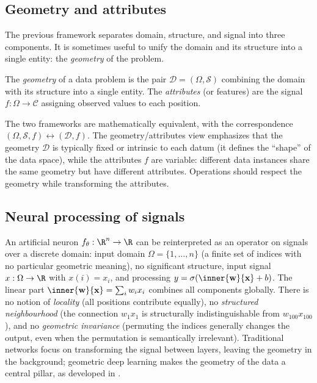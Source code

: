 \subsection{Geometry and attributes}
\label{sec:found:geometry-attributes}

The previous framework separates domain, structure, and signal into three
components. It is sometimes useful to unify the domain and its structure into a
single entity: the \emph{geometry} of the problem.

\begin{definition}
\label{def:found:geometry}
The \emph{geometry} of a data problem is the pair $\mathcal{D} = (\Omega,
\mathcal{S})$ combining the domain with its structure into a single entity. The
\emph{attributes} (or features) are the signal $f : \Omega \to \mathcal{C}$
assigning observed values to each position.
\end{definition}

The two frameworks are mathematically equivalent, with the correspondence
$(\Omega, \mathcal{S}, f) \leftrightarrow (\mathcal{D}, f)$. The
geometry/attributes view emphasizes that the geometry $\mathcal{D}$ is typically
fixed or intrinsic to each datum (it defines the ``shape'' of the data space),
while the attributes $f$ are variable: different data instances share the same
geometry but have different attributes. Operations should respect the geometry
while transforming the attributes.

\subsection{Neural processing of signals}
\label{sec:found:neuron-as-operator}

An artificial neuron $f_\theta : \R^n \to \R$ can be reinterpreted as an operator
on signals over a discrete domain: input domain $\Omega = \{1, \ldots, n\}$ (a
finite set of indices with no particular geometric meaning), no significant
structure, input signal $x : \Omega \to \R$ with $x(i) = x_i$, and processing
$y = \sigma(\inner{\mathbf{w}}{\mathbf{x}} + b)$. The linear part
$\inner{\mathbf{w}}{\mathbf{x}} = \sum_i w_i x_i$ combines all components
globally. There is no notion of \emph{locality} (all positions contribute
equally), no \emph{structured neighbourhood} (the connection $w_1 x_1$ is
structurally indistinguishable from $w_{100} x_{100}$), and no \emph{geometric
invariance} (permuting the indices generally changes the output, even when the
permutation is semantically irrelevant). Traditional networks focus on
transforming the signal between layers, leaving the geometry in the background;
geometric deep learning makes the geometry of the data a central pillar, as
developed in .

